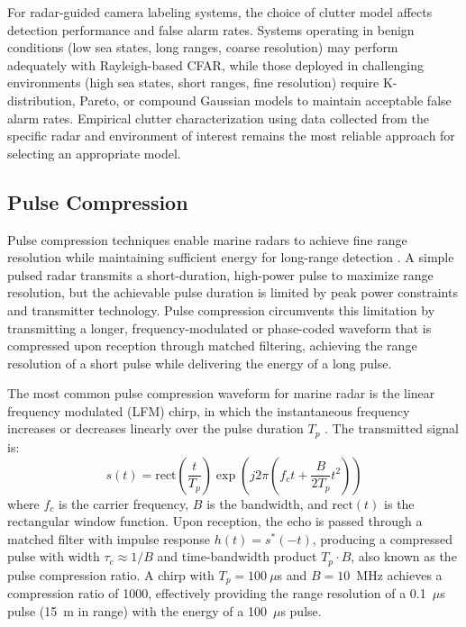 For radar-guided camera labeling systems, the choice of clutter model affects detection performance and false alarm rates. Systems operating in benign conditions (low sea states, long ranges, coarse resolution) may perform adequately with Rayleigh-based CFAR, while those deployed in challenging environments (high sea states, short ranges, fine resolution) require K-distribution, Pareto, or compound Gaussian models to maintain acceptable false alarm rates. Empirical clutter characterization using data collected from the specific radar and environment of interest remains the most reliable approach for selecting an appropriate model.

\subsection{Pulse Compression}

Pulse compression techniques enable marine radars to achieve fine range resolution while maintaining sufficient energy for long-range detection \cite{Richards2022}. A simple pulsed radar transmits a short-duration, high-power pulse to maximize range resolution, but the achievable pulse duration is limited by peak power constraints and transmitter technology. Pulse compression circumvents this limitation by transmitting a longer, frequency-modulated or phase-coded waveform that is compressed upon reception through matched filtering, achieving the range resolution of a short pulse while delivering the energy of a long pulse.

The most common pulse compression waveform for marine radar is the linear frequency modulated (LFM) chirp, in which the instantaneous frequency increases or decreases linearly over the pulse duration $T_p$ \cite{Cook1960}. The transmitted signal is:
\begin{equation}
s(t) = \text{rect}\left( \frac{t}{T_p} \right) \exp \left( j 2\pi \left( f_c t + \frac{B}{2T_p} t^2 \right) \right)
\end{equation}
where $f_c$ is the carrier frequency, $B$ is the bandwidth, and $\text{rect}(t)$ is the rectangular window function. Upon reception, the echo is passed through a matched filter with impulse response $h(t) = s^*(-t)$, producing a compressed pulse with width $\tau_c \approx 1/B$ and time-bandwidth product $T_p \cdot B$, also known as the pulse compression ratio. A chirp with $T_p = 100~\mu$s and $B = 10$~MHz achieves a compression ratio of 1000, effectively providing the range resolution of a 0.1~$\mu$s pulse (15~m in range) with the energy of a 100~$\mu$s pulse.

